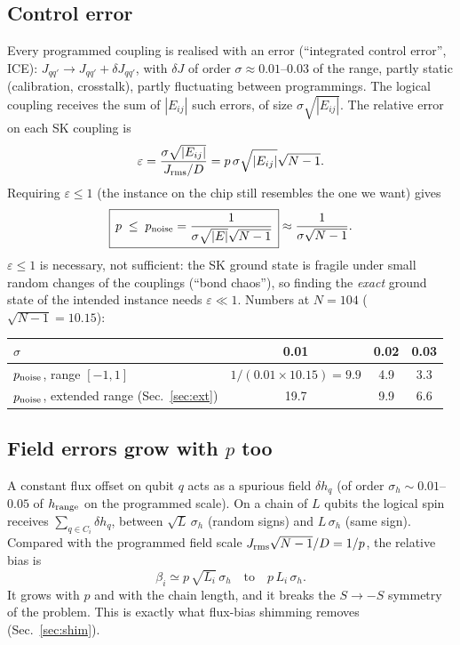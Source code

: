\documentclass[11pt,a4paper]{article}
\begin{document}
\subsection{Control error}
Every programmed coupling is realised with an error (``integrated control error'', ICE): $J_{qq'}\to J_{qq'}+\delta J_{qq'}$, with $\delta J$ of order $\sigma\approx0.01$--$0.03$ of the range, partly static (calibration, crosstalk), partly fluctuating between programmings. The logical coupling receives the sum of $|E_{ij}|$ such errors, of size $\sigma\sqrt{|E_{ij}|}$. The relative error on each SK coupling is
\begin{equation}
\varepsilon=\frac{\sigma\sqrt{|E_{ij}|}}{J_{\rm rms}/D}=p\,\sigma\sqrt{|E_{ij}|}\sqrt{N-1}.
\end{equation}
Requiring $\varepsilon\le1$ (the instance on the chip still resembles the one we want) gives
\begin{equation}
\boxed{\,p\;\le\;p_{\rm noise}=\frac{1}{\sigma\sqrt{|E|}\sqrt{N-1}}\,}\approx\frac{1}{\sigma\sqrt{N-1}} .
\end{equation}
$\varepsilon\le1$ is necessary, not sufficient: the SK ground state is fragile under small random changes of the couplings (``bond chaos''), so finding the \emph{exact} ground state of the intended instance needs $\varepsilon\ll1$. Numbers at $N=104$ ($\sqrt{N-1}=10.15$):
\begin{center}
\begin{tabular}{lccc}
\toprule
$\sigma$ & 0.01 & 0.02 & 0.03\\
\midrule
$p_{\rm noise}$, range $[-1,1]$ & $1/(0.01\times10.15)=9.9$ & 4.9 & 3.3\\
$p_{\rm noise}$, extended range (Sec.~\ref{sec:ext}) & 19.7 & 9.9 & 6.6\\
\bottomrule
\end{tabular}
\end{center}

\subsection{Field errors grow with $p$ too}
A constant flux offset on qubit $q$ acts as a spurious field $\delta h_q$ (of order $\sigma_h\sim0.01$--$0.05$ of $h_{\rm range}$ on the programmed scale). On a chain of $L$ qubits the logical spin receives $\sum_{q\in C_i}\delta h_q$, between $\sqrt L\,\sigma_h$ (random signs) and $L\,\sigma_h$ (same sign). Compared with the programmed field scale $J_{\rm rms}\sqrt{N-1}/D=1/p$, the relative bias is
\begin{equation}
\beta_i\simeq p\,\sqrt{L_i}\,\sigma_h\quad\text{to}\quad p\,L_i\,\sigma_h .
\end{equation}
It grows with $p$ and with the chain length, and it breaks the $S\to-S$ symmetry of the problem. This is exactly what flux-bias shimming removes (Sec.~\ref{sec:shim}).
\end{document}
